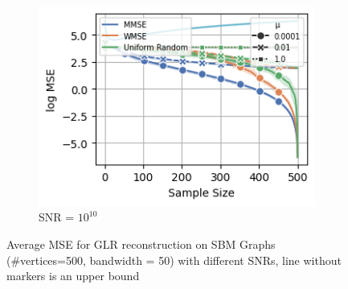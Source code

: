 \begin{figure}
\begin{subfigure}{0.3\columnwidth}
    \end{subfigure}\hfill%
    \begin{subfigure}{0.3\columnwidth}
    \includegraphics[width=\columnwidth]{figures/proj1/plots/GLR_MSE/SBM_500_bandwidth_50_SNRdbs_100.0_samps_500_mus_0.0001_0.01_1_full_band.png}
    \caption{SNR = $10^{10}$}%
    \label{GLR_SBM_MSE_subfigc}%
    \end{subfigure}%
    \caption{\color{black}Average MSE for GLR reconstruction on SBM Graphs (\#vertices=500, bandwidth = 50) with different SNRs, line without markers is an upper bound}
\label{GLR_SBM_MSE_fig}
\end{figure}

